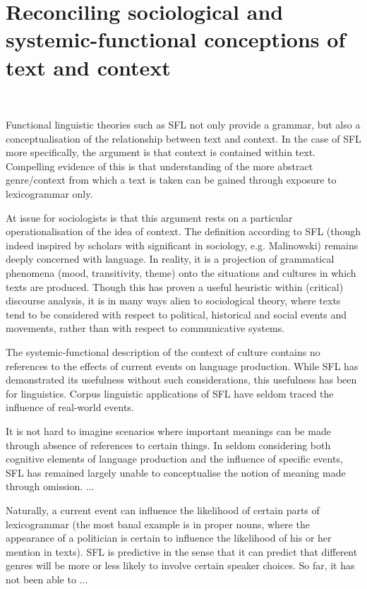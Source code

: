         
\section{Reconciling sociological and systemic-functional conceptions of text and context}

	
    ~\ 
    

    Functional linguistic theories such as SFL not only provide a grammar, but also a conceptualisation of the relationship between text and context. In the case of SFL more specifically, the argument is that context is contained within text. Compelling evidence of this is that understanding of the more abstract genre\slash context from which a text is taken can be gained through exposure to lexicogrammar only.

            At issue for sociologists is that this argument rests on a particular operationalisation of the idea of context. The definition according to SFL (though indeed inspired by scholars with significant in sociology, e.g. Malinowski) remains deeply concerned with language. In reality, it is a projection of grammatical phenomena (mood, transitivity, theme) onto the situations and cultures in which texts are produced. Though this has proven a useful heuristic within (critical) discourse analysis, it is in many ways alien to sociological theory, where texts tend to be considered with respect to political, historical and social events and movements, rather than with respect to communicative systems.

	The systemic-functional description of the context of culture contains no references to the effects of current events on language production. While SFL has demonstrated its usefulness without such considerations, this usefulness has been for linguistics. Corpus linguistic applications of SFL have seldom traced the influence of real-world events.

            It is not hard to imagine scenarios where important meanings can be made through absence of references to certain things. In seldom considering both cognitive elements of language production and the influence of specific events, SFL has remained largely unable to conceptualise the notion of meaning made through omission. ...

            Naturally, a current event can influence the likelihood of certain parts of lexicogrammar (the most banal example is in proper nouns, where the appearance of a politician is certain to influence the likelihood of his or her mention in texts).  SFL is predictive in the sense that it can predict that different genres will be more or less likely to involve certain speaker choices. So far, it has not been able to ...


